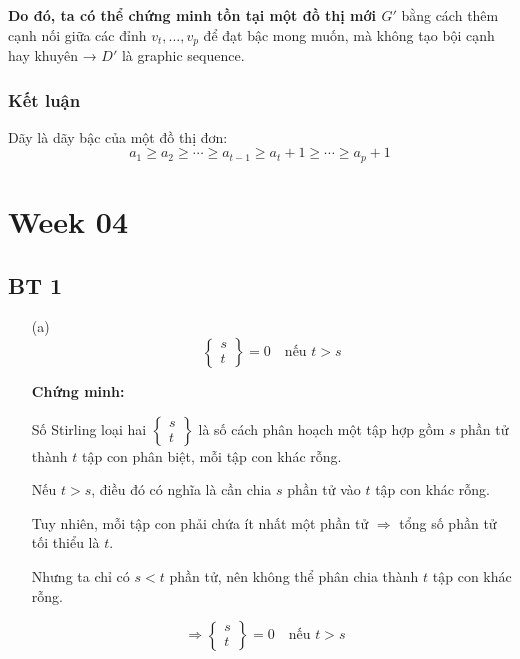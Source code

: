 \documentclass{article}
\begin{document}
	\textbf{Do đó, ta có thể chứng minh tồn tại một đồ thị mới \( G' \)} bằng cách thêm cạnh nối giữa các đỉnh \( v_t, \ldots, v_p \) để đạt bậc mong muốn, mà không tạo bội cạnh hay khuyên → \( D' \) là graphic sequence.
	
	\subsubsection*{Kết luận}
	
	Dãy là dãy bậc của một đồ thị đơn:
	\[
	a_1 \geq a_2 \geq \cdots \geq a_{t-1} \geq a_t + 1 \geq \cdots \geq a_p + 1
	\]
	
	\newpage
	\section*{Week 04}
	\subsection*{BT 1}
	\begin{enumerate}
		\item[(a)] 
		\[
		\left\{ \begin{matrix}
			s \\
			t
		\end{matrix} \right\} = 0 \quad \text{nếu } t > s
		\]
		
		\textbf{Chứng minh:}
		
		Số Stirling loại hai $\left\{ \begin{matrix}
			s \\
			t
		\end{matrix} \right\}$ là số cách phân hoạch một tập hợp gồm $s$ phần tử thành $t$ tập con phân biệt, mỗi tập con khác rỗng.
		
		Nếu $t > s$, điều đó có nghĩa là cần chia $s$ phần tử vào $t$ tập con khác rỗng.
		
		Tuy nhiên, mỗi tập con phải chứa ít nhất một phần tử $\Rightarrow$ tổng số phần tử tối thiểu là $t$. 
		
		Nhưng ta chỉ có $s < t$ phần tử, nên không thể phân chia thành $t$ tập con khác rỗng.
		
		\[
		\Rightarrow \left\{ \begin{matrix}
			s \\
			t
		\end{matrix} \right\} = 0 \quad \text{nếu } t > s \quad
		\]
	\end{enumerate}
	
\end{document}
